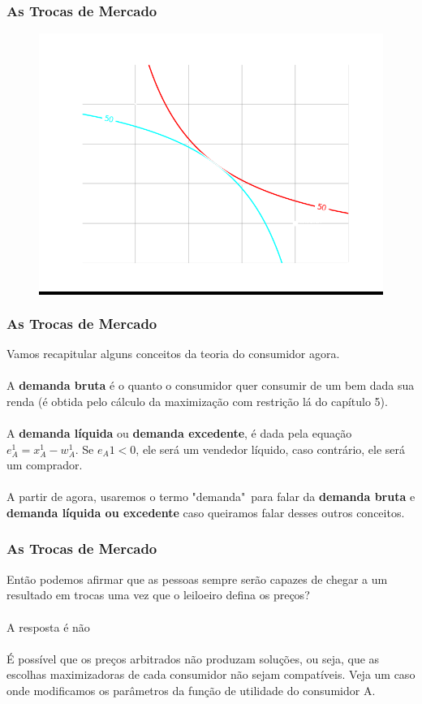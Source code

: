 \documentclass{beamer}[10]
\begin{document}
\begin{frame}
	\frametitle{As Trocas de Mercado}

	\begin{figure}[H]
		\centering
		\colorbox{black}{\includegraphics[scale=0.6]{cap32_4-caixa_edgeworth_2.png}}
	\end{figure}
		
\end{frame}

\begin{frame}
	\frametitle{As Trocas de Mercado}

	Vamos recapitular alguns conceitos da teoria do consumidor agora.
	\\~\\
	A \textbf{demanda bruta} é o quanto o consumidor quer consumir de um bem dada sua renda (é obtida pelo cálculo da maximização com restrição lá do capítulo 5). 
	\\~\\
	A \textbf{demanda líquida} ou \textbf{demanda excedente}, é dada pela equação $e_A^1 = x_A^1 - w_A^1$. Se $e_A1 < 0$, ele será um vendedor líquido, caso contrário, ele será um comprador. 
	\\~\\
	A partir de agora, usaremos o termo "demanda"\ para falar da \textbf{demanda bruta} e \textbf{demanda líquida ou excedente} caso queiramos falar desses outros conceitos.

\end{frame}

\begin{frame}
	\frametitle{As Trocas de Mercado}

	Então podemos afirmar que as pessoas sempre serão capazes de chegar a um resultado em trocas uma vez que o leiloeiro defina os preços?
	\\~\\
	A resposta é não
	\\~\\
	É possível que os preços arbitrados não produzam soluções, ou seja, que as escolhas maximizadoras de cada consumidor não sejam compatíveis. Veja um caso onde modificamos os parâmetros da função de utilidade do consumidor A.

\end{frame}
\end{document}
